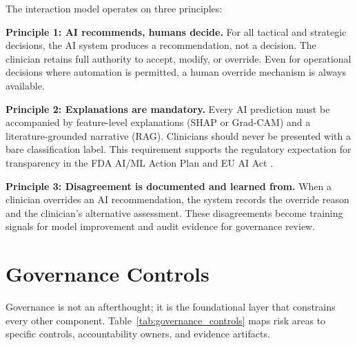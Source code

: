 The interaction model operates on three principles:

\textbf{Principle 1: AI recommends, humans decide.} For all tactical and strategic decisions, the AI system produces a recommendation, not a decision. The clinician retains full authority to accept, modify, or override. Even for operational decisions where automation is permitted, a human override mechanism is always available.

\textbf{Principle 2: Explanations are mandatory.} Every AI prediction must be accompanied by feature-level explanations (SHAP or Grad-CAM) and a literature-grounded narrative (RAG). Clinicians should never be presented with a bare classification label. This requirement supports the regulatory expectation for transparency in the FDA AI/ML Action Plan \citep{fda2021aiml} and EU AI Act \citep{eu2021aiact}.

\textbf{Principle 3: Disagreement is documented and learned from.} When a clinician overrides an AI recommendation, the system records the override reason and the clinician's alternative assessment. These disagreements become training signals for model improvement and audit evidence for governance review.

\section{Governance Controls}
\label{sec:fw_governance}

Governance is not an afterthought; it is the foundational layer that constrains every other component. Table~\ref{tab:governance_controls} maps risk areas to specific controls, accountability owners, and evidence artifacts.

